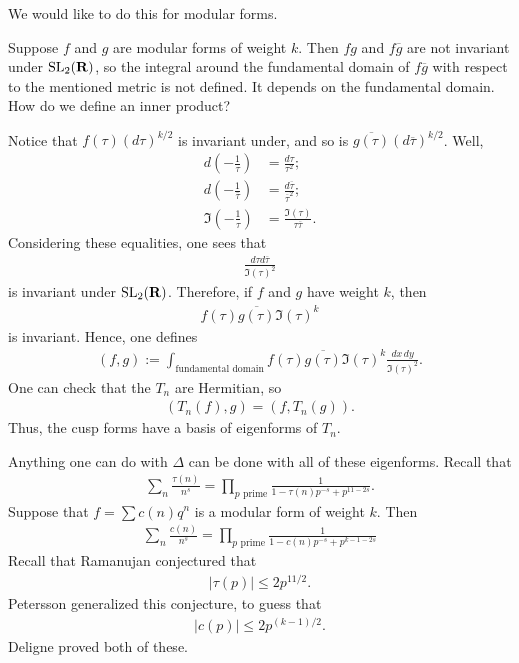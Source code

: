 \documentclass[11pt, oneside,margin=1in]{article}
\begin{document}
We would like to do this for modular forms.
\begin{problem}
	Suppose $f$ and $g$ are modular forms of weight $k$. Then $fg$ and $f \overline{g}$ are not invariant under $\operatorname{SL}_{2}(\mathbf R)$, so the integral around the fundamental domain of $f \overline{g}$ with respect to the mentioned metric is not defined. It depends on the fundamental domain. How do we define an inner product?
\end{problem}

Notice that $f(\tau) (d\tau)^{k/2}$ is invariant under, and so is $\overline{g(\tau)} (d \overline{\tau}) ^{k/2}$. Well, 
\begin{align*}
	d  \left( -\frac{1}{\tau} \right) &= \frac{d\tau}{\tau^2};\\
	d \left( -\frac{1}{\overline{\tau}} \right) &= \frac{d \overline{\tau}}{\overline{\tau}^2};\\
	\Im \left( -\frac{1}{\tau} \right) &= \frac{\Im(\tau)}{\tau \overline{\tau}}. 
\end{align*}
Considering these equalities, one sees that 
\begin{align*}
	\frac{d\tau d \overline{\tau}}{\Im(\tau) ^2}
\end{align*}
is invariant under $\operatorname{SL}_{2}(\mathbf R)$. Therefore, if $f$ and $g$ have weight $k$, then
\begin{align*}
	f(\tau) \overline{g(\tau)} \Im(\tau)^k
\end{align*}
is invariant. Hence, one defines
\begin{align*}
	(f,g) :=  \int_{\textrm{fundamental domain}} f(\tau) \overline{g(\tau)} \Im(\tau)^k \frac{dx\,dy}{\Im(\tau)^2}. 
\end{align*}
One can check that the $T_n$ are Hermitian, so
\begin{align*}
	(T_n(f),g) =  (f, T_n(g)).
\end{align*}
Thus, the cusp forms have a basis of eigenforms of $T_n$. 

Anything one can do with $\Delta$ can be done with all of these eigenforms. Recall that
\begin{align*}
	\sum_{n}^{} \frac{\tau(n)}{n^s} = \prod_{p \textrm{ prime}} \frac{1}{1-\tau(n)p^{-s} + p^{11-2s}}.
\end{align*}
Suppose that $f = \sum c(n)q^n$ is a modular form of weight $k$. Then
\begin{align*}
	\sum_{n}^{} \frac{c(n)}{n^s} = \prod_{p\textrm{ prime}} \frac{1}{1 - c(n)p^{-s} + p^{k-1-2s}}
\end{align*}
Recall that Ramanujan conjectured that
\begin{align*}
	\left\lvert \tau(p) \right\rvert \le 2p^{11/2}.
\end{align*}
Petersson generalized this conjecture, to guess that
\begin{align*}
	\left\lvert c(p) \right\rvert \le 2p^{(k-1) /2}.
\end{align*}
Deligne proved both of these.
\end{document}
